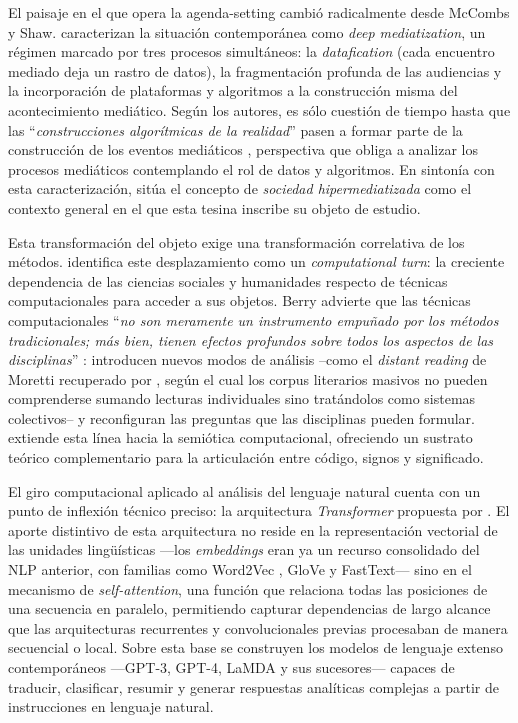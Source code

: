 \documentclass[12pt]{report}
\begin{document}
El paisaje en el que opera la agenda-setting cambió radicalmente desde McCombs y Shaw. \citet{couldry:2017} caracterizan la situación contemporánea como \textit{deep mediatization}, un régimen marcado por tres procesos simultáneos: la \textit{datafication} (cada encuentro mediado deja un rastro de datos), la fragmentación profunda de las audiencias y la incorporación de plataformas y algoritmos a la construcción misma del acontecimiento mediático. Según los autores, es sólo cuestión de tiempo hasta que las ``\textit{construcciones algorítmicas de la realidad}'' pasen a formar parte de la construcción de los eventos mediáticos \citep[p.~3 de la versión aceptada]{couldry:2017}, perspectiva que obliga a analizar los procesos mediáticos contemplando el rol de datos y algoritmos. En sintonía con esta caracterización, \citet{carlon:2020} sitúa el concepto de \textit{sociedad hipermediatizada} como el contexto general en el que esta tesina inscribe su objeto de estudio.

Esta transformación del objeto exige una transformación correlativa de los métodos. \citet{berry:2011} identifica este desplazamiento como un \textit{computational turn}: la creciente dependencia de las ciencias sociales y humanidades respecto de técnicas computacionales para acceder a sus objetos. Berry advierte que las técnicas computacionales ``\textit{no son meramente un instrumento empuñado por los métodos tradicionales; más bien, tienen efectos profundos sobre todos los aspectos de las disciplinas}'' \citep[p.~13]{berry:2011}: introducen nuevos modos de análisis --como el \textit{distant reading} de Moretti recuperado por \citet{berry:2011}, según el cual los corpus literarios masivos no pueden comprenderse sumando lecturas individuales sino tratándolos como sistemas colectivos-- y reconfiguran las preguntas que las disciplinas pueden formular. \citet{meunier:2021} extiende esta línea hacia la semiótica computacional, ofreciendo un sustrato teórico complementario para la articulación entre código, signos y significado.

El giro computacional aplicado al análisis del lenguaje natural cuenta con un punto de inflexión técnico preciso: la arquitectura \textit{Transformer} propuesta por \citet{vaswani:2017}. El aporte distintivo de esta arquitectura no reside en la representación vectorial de las unidades lingüísticas ---los \textit{embeddings} eran ya un recurso consolidado del NLP anterior, con familias como Word2Vec \citep{mikolov:2013}, GloVe y FastText--- sino en el mecanismo de \textit{self-attention}, una función que relaciona todas las posiciones de una secuencia en paralelo, permitiendo capturar dependencias de largo alcance que las arquitecturas recurrentes y convolucionales previas procesaban de manera secuencial o local. Sobre esta base se construyen los modelos de lenguaje extenso contemporáneos ---GPT-3, GPT-4, LaMDA y sus sucesores--- capaces de traducir, clasificar, resumir y generar respuestas analíticas complejas a partir de instrucciones en lenguaje natural.
\end{document}
